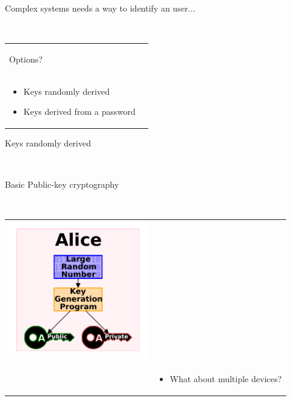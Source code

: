 \documentclass[12pt]{beamer}
\renewcommand{\frametitle}[1]{\vspace{0.2cm}\begin{huge}#1\end{huge}\\}
\renewcommand{\framesubtitle}[1]{\vspace{0.4cm} \hspace{0.4cm}\begin{large}#1\end{large}\\}
\begin{document}
  \begin{frame}
  \frametitle{Complex systems needs a way to identify an user...}
  \begin{table}
  \begin{tabular}{p{7cm}p{3cm}}
  \framesubtitle{Options?}
  \begin{itemize}
    \item Keys randomly derived
    \item Keys derived from a password
  \end{itemize}
  &
  \vspace{1.5cm}
  \end{tabular}
  \end{table}
  \end{frame}

  \begin{frame}
  \frametitle{Keys randomly derived}
  \framesubtitle{Basic Public-key cryptography}
  \begin{table}
  \begin{tabular}{p{7cm}p{3cm}}
  \includegraphics[width=6cm]{img/Public-key-crypto}\\
  &
  \begin{itemize}
    \item What about multiple devices?
  \end{itemize}
  \end{tabular}
  \end{table}
  \end{frame}
\end{document}
